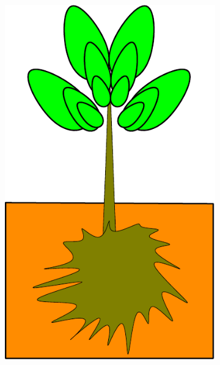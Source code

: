 \documentclass[10pt]{article}
\begin{document}
\begin{figure}[!ht]
\begin{subfigure}[b]{.1125\linewidth}
\includegraphics[width=1.0\linewidth]{img/tree_pics_4}
\caption{}  %
\label{fig:grow_4}
\end{subfigure}
\begin{subfigure}[b]{.1125\linewidth}
\centering

\end{subfigure}
\end{figure}
\end{document}
